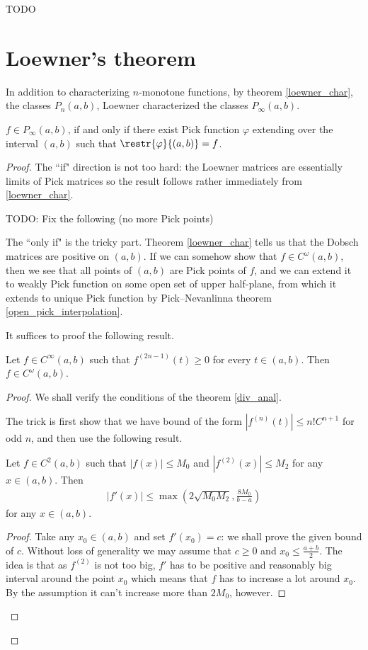 TODO

\section{Loewner's theorem}

In addition to characterizing $n$-monotone functions, by theorem \ref{loewner_char}, the classes $P_{n}(a, b)$, Loewner characterized the classes $P_{\infty}(a, b)$.

\begin{lause}\label{loewners_theorem}
	$f \in P_{\infty}(a, b)$, if and only if there exist Pick function $\varphi$ extending over the interval $(a, b)$ such that $\restr{\varphi}{(a, b)} = f$.
\end{lause}

\begin{proof}
	The ``if" direction is not too hard: the Loewner matrices are essentially limits of Pick matrices so the result follows rather immediately from \ref{loewner_char}.

	TODO: Fix the following (no more Pick points)

	The ``only if" is the tricky part. Theorem \ref{loewner_char} tells us that the Dobsch matrices are positive on $(a, b)$. If we can somehow show that $f \in C^{\omega}(a, b)$, then we see that all points of $(a, b)$ are Pick points of $f$, and we can extend it to weakly Pick function on some open set of upper half-plane, from which it extends to unique Pick function by Pick--Nevanlinna theorem \ref{open_pick_interpolation}.

	It suffices to proof the following result.

	\begin{lem}
		Let $f \in C^{\infty}(a, b)$ such that $f^{(2 n - 1)}(t) \geq 0$ for every $t \in (a, b)$. Then $f \in C^{\omega}(a, b)$.
	\end{lem}
	\begin{proof}
		We shall verify the conditions of the theorem \ref{div_anal}.

		The trick is first show that we have bound of the form $|f^{(n)}(t)| \leq n! C^{n + 1}$ for odd $n$, and then use the following result.
		\begin{lem}
			Let $f \in C^{2}(a, b)$ such that $|f(x)| \leq M_{0}$ and $|f^{(2)}(x)| \leq M_{2}$ for any $x \in (a, b)$. Then
			\begin{align*}
			|f'(x)| \leq \max\left(2\sqrt{M_{0} M_{2}}, \frac{8 M_{0}}{b - a}\right)
			\end{align*}
			for any $x \in (a, b)$.
		\end{lem}
		\begin{proof}
			Take any $x_{0} \in (a, b)$ and set $f'(x_{0}) = c$: we shall prove the given bound of $c$. Without loss of generality we may assume that $c \geq 0$ and $x_{0} \leq \frac{a + b}{2}$. The idea is that as $f^{(2)}$ is not too big, $f'$ has to be positive and reasonably big interval around the point $x_{0}$ which means that $f$ has to increase a lot around $x_{0}$. By the assumption it can't increase more than $2 M_{0}$, however.


\end{proof}
\end{proof}
\end{proof}
